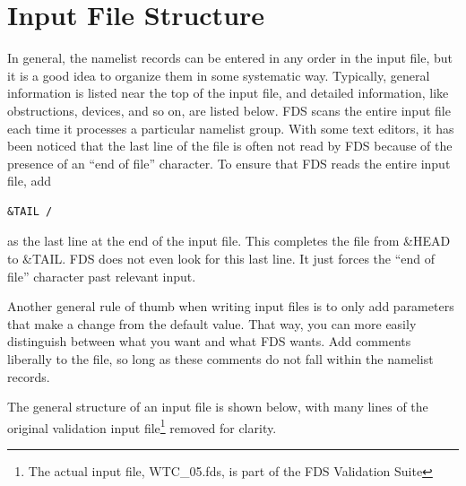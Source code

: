 \documentclass[11pt]{book}
\begin{document}
\section{Input File Structure}

In general, the namelist records can be entered in any order in the input file, but it is a good idea to organize them
in some systematic way. Typically, general information is listed near the top of the input file, and detailed information, like
obstructions, devices, and so on, are listed below. FDS scans the entire input file each time it processes a particular namelist group.
With some text editors, it has been noticed that the last line of the file is often not read by FDS because of the presence of an
``end of file'' character.
To ensure that FDS reads the entire input file, add
\begin{lstlisting}
&TAIL /
\end{lstlisting}
as the last line at the end of the input file. This completes the file from {\ct \&HEAD} to {\ct \&TAIL}. FDS does not even look for
this last line. It just forces the ``end of file'' character past relevant input.

Another general rule of thumb when writing input files is to only add parameters that make a change from the
default value. That way, you can more easily distinguish between what you want and what FDS wants.
Add comments liberally to the file, so long as
these comments do not fall within the namelist records.

The general structure of an input file is shown below, with many
lines of the original validation input file\footnote{The actual input file, WTC\_05.fds, is part of the FDS
Validation Suite} removed for clarity.
\end{document}

